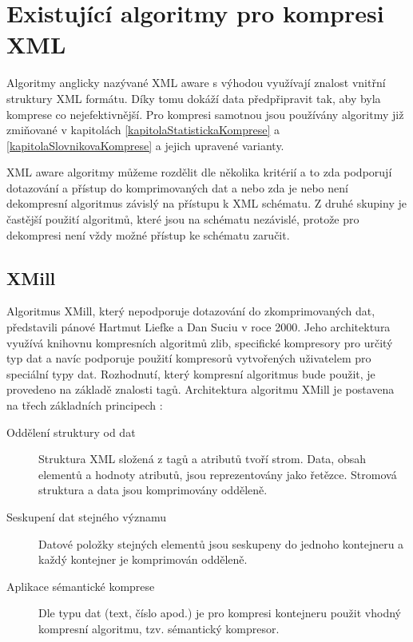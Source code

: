 \chapter{Existující algoritmy pro kompresi XML}
\label{kapitolaXmlAlgoritmy}

Algoritmy anglicky nazývané XML aware s výhodou využívají znalost vnitřní struktury XML formátu. Díky tomu dokáží data předpřipravit tak, aby byla komprese co nejefektivnější. Pro kompresi samotnou jsou používány algoritmy již zmiňované v kapitolách \ref{kapitolaStatistickaKomprese} a \ref{kapitolaSlovnikovaKomprese} a jejich upravené varianty.

XML aware algoritmy můžeme rozdělit dle několika kritérií a to zda podporují dotazování a přístup do komprimovaných dat a nebo zda je nebo není dekompresní algoritmus závislý na přístupu k XML schématu. Z druhé skupiny je častější použití algoritmů, které jsou na schématu nezávislé, protože pro dekompresi není vždy možné přístup ke schématu zaručit.

\section{XMill}
Algoritmus XMill, který nepodporuje dotazování do zkomprimovaných dat, představili pánové Hartmut Liefke a Dan Suciu v roce 2000. Jeho architektura využívá knihovnu kompresních algoritmů zlib, specifické kompresory pro určitý typ dat a navíc podporuje použití kompresorů vytvořených uživatelem pro speciální typy dat. Rozhodnutí, který kompresní algoritmus bude použit, je provedeno na základě znalosti tagů. Architektura algoritmu XMill je postavena na třech základních principech \cite{xmill}:

\begin{description}
\item[Oddělení struktury od dat] Struktura XML složená z tagů a atributů tvoří strom. Data, obsah elementů a hodnoty atributů, jsou reprezentovány jako řetězce. Stromová struktura a data jsou komprimovány odděleně.
\item[Seskupení dat stejného významu] Datové položky stejných elementů jsou seskupeny do jednoho kontejneru a každý kontejner je komprimován odděleně.
\item[Aplikace sémantické komprese] Dle typu dat (text, číslo apod.) je pro kompresi kontejneru použit vhodný kompresní algoritmu, tzv. sémantický kompresor.
\end{description}

